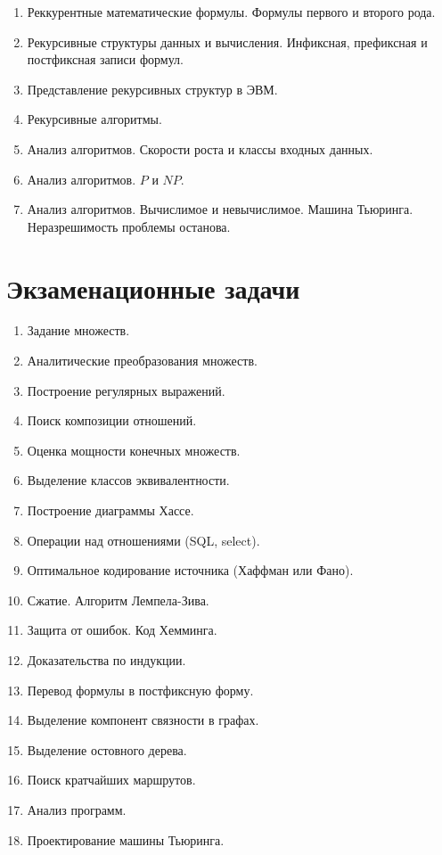 \begin{enumerate}
    \item Реккурентные математические формулы. Формулы первого и второго рода.
    
    \item Рекурсивные структуры данных и вычисления. Инфиксная, префиксная и постфиксная записи формул.
    
    \item Представление рекурсивных структур в ЭВМ.
    
    \item Рекурсивные алгоритмы.
    
    \item Анализ алгоритмов. Скорости роста и классы входных данных.
    
    \item Анализ алгоритмов. $P$ и $NP$.
    
    \item Анализ алгоритмов. Вычислимое и невычислимое. Машина Тьюринга. Неразрешимость проблемы останова.
    
\end{enumerate}


\section{Экзаменационные задачи}

\begin{enumerate}
    \item Задание множеств.
    \item Аналитические преобразования множеств.
    \item Построение регулярных выражений.
    \item Поиск композиции отношений.
    \item Оценка мощности конечных множеств.
    \item Выделение классов эквивалентности.
    \item Построение диаграммы Хассе.
    \item Операции над отношениями (SQL, select).
    \item Оптимальное кодирование источника (Хаффман или Фано).
    \item Сжатие. Алгоритм Лемпела-Зива.
    \item Защита от ошибок. Код Хемминга.
    \item Доказательства по индукции.
    \item Перевод формулы в постфиксную форму.
    \item Выделение компонент связности в графах.
    \item Выделение остовного дерева.
    \item Поиск кратчайших маршрутов.
    \item Анализ программ.
    \item Проектирование машины Тьюринга.
\end{enumerate}
